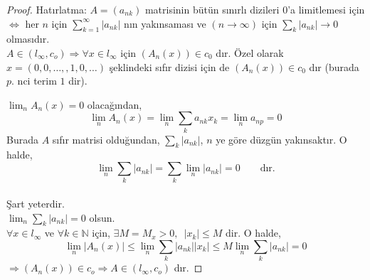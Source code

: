 \begin{proof}
Hatırlatma: $A=\left(a_{nk}\right)$ matrisinin bütün sınırlı dizileri $0$'a limitlemesi için $\iff$ her $n$ için $\sum\limits_{k=1}^\infty|a_{nk}|$ nın yakınsaması ve $(n\to\infty)$ için $\sum\limits_k|a_{nk}|\to 0$ olmasıdır.\\[5pt]

$A\in(l_\infty,c_o)\Rightarrow \forall x\in l_\infty$ için $\left(A_n(x)\right)\in c_0$ dır. Özel olarak $x=(0,0,\ldots,,1,0,\ldots)$ şeklindeki sıfır dizisi için de $\left(A_n(x)\right)\in c_0$ dır (burada $p$. nci terim $1$ dir).

$\lim_nA_n(x)=0$ olacağından,
$$
\lim_nA_n(x)=\lim_n\sum_ka_{nk}x_k=\lim_na_{np}=0
$$
Burada $A$ sıfır matrisi olduğundan, $\sum\limits_k|a_{nk}|$, $n$ ye göre düzgün yakınsaktır. O halde,
$$
\lim_n\sum_k|a_{nk}|=\sum_k\lim_n|a_{nk}|=0\qquad\text{dır.}
$$
\\[5pt]
Şart yeterdir.\\[5pt]
$\lim_n\sum\limits_k|a_{nk}|=0$ olsun.\\[5pt]
$\forall x\in l_\infty$ ve $\forall k\in\mathbb{N}$ için, $\exists M=M_x>0,\,\,\,|x_k|\leq M$ dir. O halde,
$$
\lim_n|A_n(x)|\leq\lim_n\sum_k|a_{nk}||x_k|\leq M\lim_n\sum_k|a_{nk}|=0
$$
$\Rightarrow (A_n(x))\in c_o\Rightarrow A\in (l_\infty,c_o)$ dır.
\end{proof}

